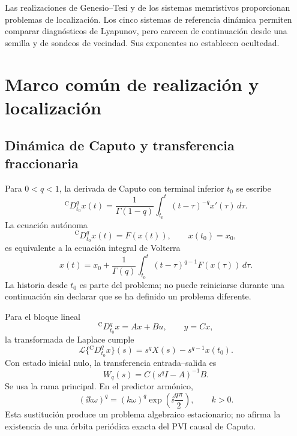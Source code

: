 Las realizaciones de Genesio--Tesi y de los sistemas memristivos proporcionan
problemas de localización. Los cinco sistemas de referencia dinámica permiten
comparar diagnósticos de Lyapunov, pero carecen de continuación desde una
semilla y de sondeos de vecindad. Sus exponentes no establecen ocultedad.

\section[Marco común de realización]{Marco común de realización y localización}

\subsection{Dinámica de Caputo y transferencia fraccionaria}

Para \(0<q<1\), la derivada de Caputo con terminal inferior \(t_0\) se escribe
\begin{equation}
 {}^{\mathrm C}D_{t_0}^{q}x(t)
 =\frac{1}{\Gamma(1-q)}
 \int_{t_0}^{t}(t-\tau)^{-q}x'(\tau)\,d\tau .
 \label{nc:eq:caputo}
\end{equation}
La ecuación autónoma
\begin{equation}
 {}^{\mathrm C}D_{t_0}^{q}x(t)=F(x(t)),\qquad x(t_0)=x_0,
 \label{nc:eq:ivp}
\end{equation}
es equivalente a la ecuación integral de Volterra
\begin{equation}
 x(t)=x_0+\frac{1}{\Gamma(q)}
 \int_{t_0}^{t}(t-\tau)^{q-1}F(x(\tau))\,d\tau .
 \label{nc:eq:volterra}
\end{equation}
La historia desde \(t_0\) es parte del problema; no puede reiniciarse durante
una continuación sin declarar que se ha definido un problema diferente.

Para el bloque lineal
\begin{equation}
 {}^{\mathrm C}D_{t_0}^{q}x=Ax+Bu,
 \qquad y=Cx,
 \label{nc:eq:linear-block}
\end{equation}
la transformada de Laplace cumple
\begin{equation}
 \mathcal L\{{}^{\mathrm C}D_{t_0}^{q}x\}(s)
 =s^qX(s)-s^{q-1}x(t_0).
\end{equation}
Con estado inicial nulo, la transferencia entrada--salida es
\begin{equation}
 W_q(s)=C(s^qI-A)^{-1}B.
 \label{nc:eq:transfer-general}
\end{equation}
Se usa la rama principal. En el predictor armónico,
\begin{equation}
 (\ii k\omega)^q=(k\omega)^q
 \exp\!\left(\ii\frac{q\pi}{2}\right),\qquad k>0.
 \label{nc:eq:principal-branch}
\end{equation}
Esta sustitución produce un problema algebraico estacionario; no afirma la
existencia de una órbita periódica exacta del PVI causal de Caputo.

